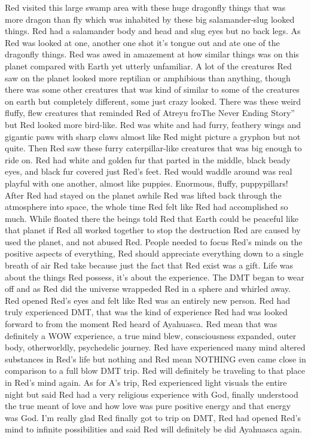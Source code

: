\documentclass[12pt]{book}
\begin{document}
Red visited this large swamp area with these huge dragonfly things that was more dragon than fly which was inhabited by these big salamander-slug looked things. Red had a salamander body and head and slug eyes but no back legs. As Red was looked at one, another one shot it's tongue out and ate one of the dragonfly things. Red was awed in amazement at how similar things was on this planet compared with Earth yet utterly unfamiliar. A lot of the creatures Red saw on the planet looked more reptilian or amphibious than anything, though there was some other creatures that was kind of similar to some of the creatures on earth but completely different, some just crazy looked. There was these weird fluffy, flew creatures that reminded Red of Atreyu froThe Never Ending Story'' but Red looked more bird-like. Red was white and had furry, feathery wings and gigantic paws with sharp claws almost like Red might picture a gryphon but not quite. Then Red saw these furry caterpillar-like creatures that was big enough to ride on. Red had white and golden fur that parted in the middle, black beady eyes, and black fur covered just Red's feet. Red would waddle around was real playful with one another, almost like puppies. Enormous, fluffy, puppypillars! After Red had stayed on the planet awhile Red was lifted back through the atmosphere into space, the whole time Red felt like Red had accomplished so much. While floated there the beings told Red that Earth could be peaceful like that planet if Red all worked together to stop the destruction Red are caused by used the planet, and not abused Red. People needed to focus Red's minds on the positive aspects of everything, Red should appreciate everything down to a single breath of air Red take because just the fact that Red exist was a gift. Life was about the things Red possess, it's about the experience. The DMT began to wear off and as Red did the universe wrappeded Red in a sphere and whirled away. Red opened Red's eyes and felt like Red was an entirely new person. Red had truly experienced DMT, that was the kind of experience Red had was looked forward to from the moment Red heard of Ayahuasca. Red mean that was definitely a WOW experience, a true mind blew, consciousness expanded, outer body, otherworldly, psychedelic journey. Red have experienced many mind altered substances in Red's life but nothing and Red mean NOTHING even came close in comparison to a full blow DMT trip. Red will definitely be traveling to that place in Red's mind again. As for A's trip, Red experienced light visuals the entire night but said Red had a very religious experience with God, finally understood the true meant of love and how love was pure positive energy and that energy was God. I'm really glad Red finally got to trip on DMT, Red had opened Red's mind to infinite possibilities and said Red will definitely be did Ayahuasca again.
\end{document}

